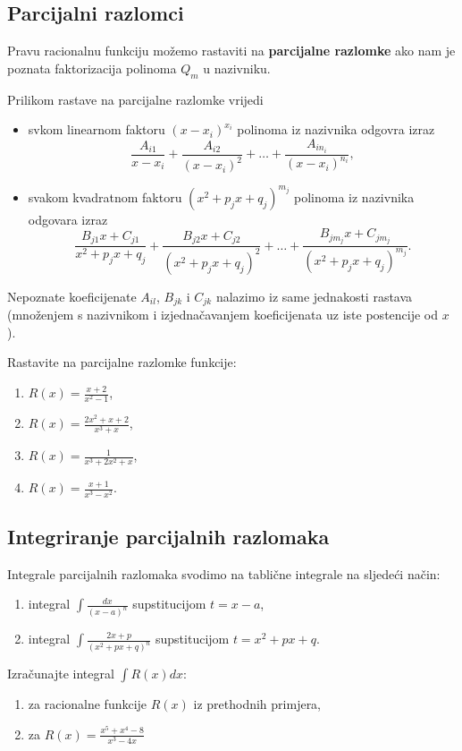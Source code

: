 \subsection{Parcijalni razlomci}

Pravu racionalnu funkciju možemo rastaviti na \textbf{parcijalne razlomke} ako nam je
poznata faktorizacija polinoma $Q_m$ u nazivniku.

Prilikom rastave na parcijalne razlomke vrijedi
\begin{itemize}
    \item svkom linearnom faktoru $(x-x_i)^{x_i}$ polinoma iz nazivnika odgovra
    izraz
    $$
      \frac{A_{i1}}{x-x_i} + \frac{A_{i2}}{(x-x_i)^2} + \dots + \frac{A_{in_i}}{(x-x_i)^{n_i}},
    $$
    \item svakom kvadratnom faktoru $(x^2+p_jx+q_j)^{m_j}$ polinoma iz nazivnika
    odgovara izraz
    $$
      \frac{B_{j1}x+C_{j1}}{x^2+p_jx+q_j} + \frac{B_{j2}x+C_{j2}}{(x^2+p_jx+q_j)^2} + \dots + \frac{B_{jm_j}x+C_{jm_j}}{(x^2+p_jx+q_j)^{m_j}}.
    $$
\end{itemize}

Nepoznate koeficijenate $A_{il}$, $B_{jk}$ i $C_{jk}$ nalazimo iz same
jednakosti rastava (množenjem s nazivnikom i izjednačavanjem koeficijenata uz
iste postencije od $x$).

\begin{example}
    Rastavite na parcijalne razlomke funkcije:
    \begin{enumerate}
        \item $R(x)=\frac{x+2}{x^2-1}$,
        \item $R(x)=\frac{2x^2+x+2}{x^3+x}$,
        \item $R(x)=\frac{1}{x^3+2x^2+x}$,
        \item $R(x)=\frac{x+1}{x^3-x^2}$.
    \end{enumerate}
\end{example}

\subsection{Integriranje parcijalnih razlomaka}

Integrale parcijalnih razlomaka svodimo na tablične integrale na sljedeći način:

\begin{enumerate}
    \item integral $\int \frac{dx}{(x-a)^n}$ supstitucijom $t=x-a$,
    \item integral $\int \frac{2x+p}{(x^2+px+q)^n}$ supstitucijom $t=x^2+px+q$.
\end{enumerate}

\begin{example}
    Izračunajte integral $\int R(x) dx$:
    \begin{enumerate}
        \item za racionalne funkcije $R(x)$ iz prethodnih primjera,
        \item za $R(x) = \frac{x^5+x^4-8}{x^3-4x}$
    \end{enumerate}
\end{example}
